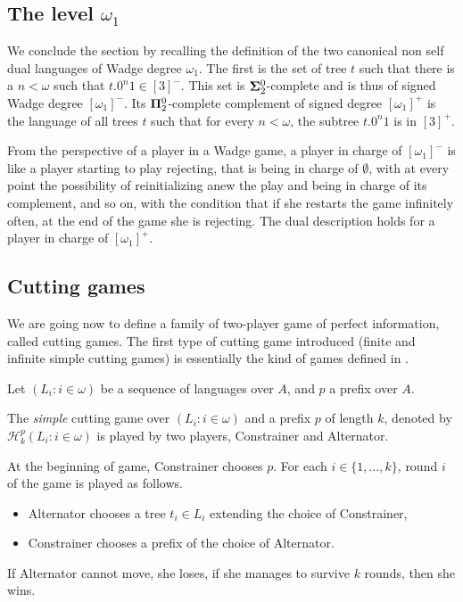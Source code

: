 \subsection{The level $\omega_1$}
We conclude the section by recalling the definition of the two canonical non self dual languages of Wadge degree $\omega_1$. The first is the set of tree $t$ such that there is a $n<\omega$ such that $t.0^n1 \in [3]^-$. This set is ${\bf \Sigma}^0_2$-complete and is thus of signed Wadge degree $[\omega_1]^-$. Its ${\bf \Pi}^0_2$-complete complement of signed degree $[\omega_1]^+$ is the language of all trees $t$ such that for every $n<\omega$, the subtree $t.0^n1$ is in  $[3]^+$.

From the perspective of a player in a Wadge game, a player in charge of $[\omega_1]^-$ is like a player starting to play rejecting, that is being in charge of $\emptyset$, with at every point the possibility of reinitializing anew the play and being in charge of its complement, and so on, with the condition that if she restarts the game infinitely often, at the end of the game she is rejecting. 
The dual description holds for a player in charge of $[\omega_1]^+$.



\subsection{Cutting games}

We are going now to define a family of two-player game of perfect information, called cutting games. 
The first type of cutting game  introduced (finite and infinite simple cutting games) is essentially the kind of games defined in \cite{bp}.

Let $( L_i : i \in \omega )$ be a sequence of languages over $A$, and $p$ a prefix over $A$. 

The \emph{simple} cutting game over $( L_i : i \in \omega )$ and a prefix $p$ of length $k$, denoted by $\mathcal{H}^p_k(L_i : i \in \omega )$ is played by two players, Constrainer and Alternator.

At the beginning of game, Constrainer chooses $p$.
For each $i \in \{1, \dots, k \}$, round $i$ of the game is played as follows.
\begin{itemize}
\item Alternator chooses a tree $t_i \in L_i$ extending the choice of Constrainer, 
\item Constrainer chooses a prefix of the choice of Alternator.
\end{itemize}
If Alternator cannot move, she loses, if she manages to survive $k$ rounds, then she wins.

